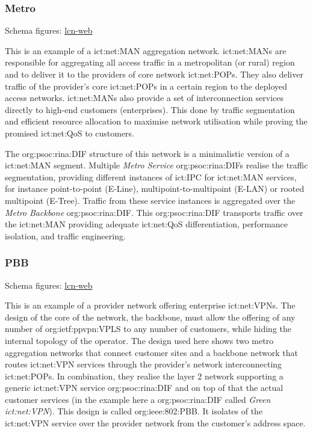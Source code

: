 \subsubsection{Metro}
\label{sec:examples:af-d22:metro}
Schema figures: \href{https://vdmeer.github.io/skb/ipc/lcn-examples/arcfire/af-d22-metro/index.html}{lcn-web}

This is an example of a \ac{ict:net:MAN} aggregation network.
\acp{ict:net:MAN} are responsible for aggregating all access traffic in a metropolitan (or rural) region and to deliver it to the providers of core network \acp{ict:net:POP}.
They also deliver traffic of the provider's core \acp{ict:net:POP} in a certain region to the deployed access networks.
\acp{ict:net:MAN} also provide a set of interconnection services directly to high-end customers (enterprises).
This done by traffic segmentation and efficient resource allocation to maximise network utilisation while proving the promised \ac{ict:net:QoS} to customers.

The \ac{org:psoc:rina:DIF} structure of this network is a minimalistic version of a \acs{ict:net:MAN} segment.
Multiple \textit{Metro Service} \acp{org:psoc:rina:DIF} realise the traffic segmentation, providing different instances of \ac{ict:IPC} for \acs{ict:net:MAN} services, for instance point-to-point (E-Line), multipoint-to-multipoint (E-LAN) or rooted multipoint (E-Tree).
Traffic from these service instances is aggregated over the \textit{Metro Backbone} \ac{org:psoc:rina:DIF}.
This \ac{org:psoc:rina:DIF} transports traffic over the \acs{ict:net:MAN} providing adequate \ac{ict:net:QoS} differentiation, performance isolation, and traffic engineering.



\subsubsection{PBB}
\label{sec:examples:af-d22:pbb}
Schema figures: \href{https://vdmeer.github.io/skb/ipc/lcn-examples/arcfire/af-d22-pbb/index.html}{lcn-web}

This is an example of a provider network offering enterprise \acp{ict:net:VPN}.
The design of the core of the network, the backbone, must allow the offering of any number of \ac{org:ietf:ppvpn:VPLS} to any number of customers, while hiding the internal topology of the operator.
The design used here shows two metro aggregation networks that connect customer sites and a backbone network that routes \ac{ict:net:VPN} services through the provider's network interconnecting \acp{ict:net:POP}.
In combination, they realise the layer 2 network supporting a generic \ac{ict:net:VPN} service \ac{org:psoc:rina:DIF} and on top of that the actual customer services (in the example here a \ac{org:psoc:rina:DIF} called \textit{Green \acs{ict:net:VPN}}).
This design is called \ac{org:ieee:802:PBB}.
It isolates of the \ac{ict:net:VPN} service over the provider network from the customer's address space.



